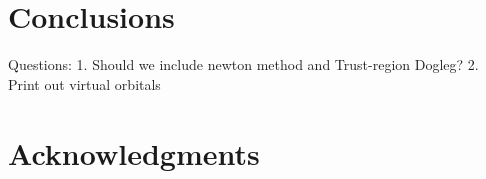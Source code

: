 \documentclass[aps,prl,reprint,amsmath,amssymb]{revtex4-1}
\begin{document}
\section{Conclusions}

Questions:
1. Should we include newton method and Trust-region Dogleg?
2. Print out virtual orbitals


\section{Acknowledgments} 


%

\end{document}
